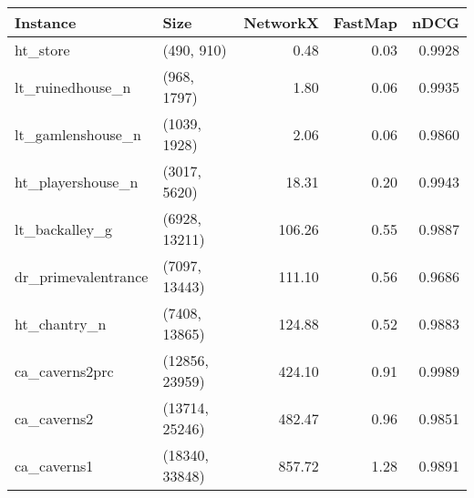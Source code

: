 \begin{tabular}{llrrr}
\toprule
           Instance &           Size &  NetworkX &  FastMap &   nDCG \\
\midrule
           ht\_store &     (490, 910) &      0.48 &     0.03 & 0.9928 \\
   lt\_ruinedhouse\_n &    (968, 1797) &      1.80 &     0.06 & 0.9935 \\
  lt\_gamlenshouse\_n &   (1039, 1928) &      2.06 &     0.06 & 0.9860 \\
  ht\_playershouse\_n &   (3017, 5620) &     18.31 &     0.20 & 0.9943 \\
     lt\_backalley\_g &  (6928, 13211) &    106.26 &     0.55 & 0.9887 \\
dr\_primevalentrance &  (7097, 13443) &    111.10 &     0.56 & 0.9686 \\
       ht\_chantry\_n &  (7408, 13865) &    124.88 &     0.52 & 0.9883 \\
     ca\_caverns2prc & (12856, 23959) &    424.10 &     0.91 & 0.9989 \\
        ca\_caverns2 & (13714, 25246) &    482.47 &     0.96 & 0.9851 \\
        ca\_caverns1 & (18340, 33848) &    857.72 &     1.28 & 0.9891 \\
\bottomrule
\end{tabular}
